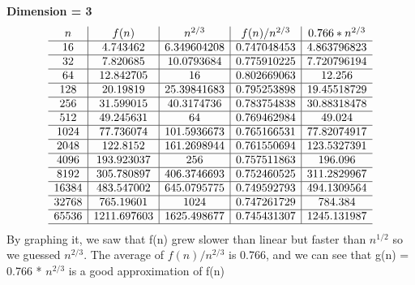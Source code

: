 \documentclass[11pt]{article}
\begin{document}
\textbf{Dimension = 3}
$$
\begin{array}{c|c|c|c|c}
n & f(n) & n^{2/3} & f(n)/n^{2/3}  & 0.766 * n^{2/3} \\ \hline 
16 & 4.743462 & 6.349604208 & 0.747048453 & 4.863796823\\ \hline
32 & 7.820685 & 10.0793684 & 0.775910225 & 7.720796194\\ \hline
64 & 12.842705 &16 & 0.802669063 &12.256\\ \hline
128 & 20.19819 & 25.39841683 & 0.795253898&19.45518729\\ \hline
256 & 31.599015 & 40.3174736 & 0.783754838 & 30.88318478\\ \hline
512 & 49.245631 & 64 & 0.769462984 & 49.024\\ \hline
1024 & 77.736074 & 101.5936673 & 0.765166531 & 77.82074917 \\ \hline
2048 & 122.8152 & 161.2698944 & 0.761550694 & 123.5327391\\ \hline
4096 & 193.923037 & 256 & 0.757511863 & 196.096\\ \hline
8192 & 305.780897 &406.3746693 & 0.752460525 &311.2829967\\ \hline
16384 & 483.547002 & 645.0795775 &0.749592793 & 494.1309564 \\ \hline
32768 & 765.19601 & 1024 & 0.747261729 & 784.384\\ \hline
65536 & 1211.697603 & 1625.498677 & 0.745431307 & 1245.131987\\ \hline
\end{array}
$$
By graphing it, we saw that f(n) grew slower than linear but faster than $n^{1/2}$ so we guessed $n^{2/3}$. The average of $f(n)/n^{2/3}$ is 0.766, and we can see that g(n) = 0.766 * $n^{2/3}$ is a good approximation of f(n)
\end{document}
